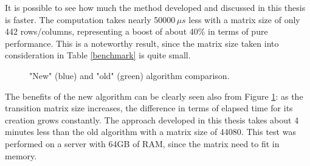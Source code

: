 It is possible to see how much the method developed and discussed in this thesis is faster. The computation takes nearly 50000\(\,\mu{s} \) less with a matrix size of only 442 rows/columns, representing a boost of about 40\% in terms of pure performance. This is a noteworthy result, since the matrix size taken into consideration in Table \ref{benchmark} is quite small.\\

\begin{figure}[H]
  \caption[]{"New" (blue) and "old" (green) algorithm comparison.}
  \label{performancechart}
\end{figure}


The benefits of the new algorithm can be clearly seen also from Figure \ref{performancechart}: as the transition matrix size increases, the difference in terms of elapsed time for its creation grows constantly. The approach developed in this thesis takes about 4 minutes less than the old algorithm with a matrix size of 44080. This test was performed on a server with 64GB of RAM, since the matrix need to fit in memory.